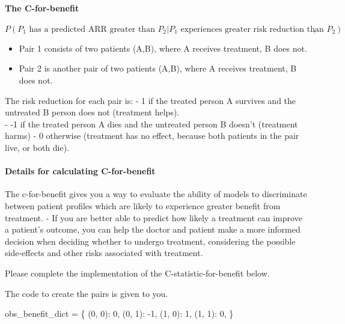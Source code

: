 \documentclass[11pt]{article}
\providecommand{\tightlist}{%
      \setlength{\itemsep}{0pt}\setlength{\parskip}{0pt}}
\newenvironment{Shaded}{}{}
\newcommand{\DecValTok}[1]{\textcolor[rgb]{0.25,0.63,0.44}{{#1}}}
\newcommand{\NormalTok}[1]{{#1}}
\begin{document}
    \hypertarget{the-c-for-benefit}{%
\paragraph{The C-for-benefit}\label{the-c-for-benefit}}

\[P(\text{$P_1$ has a predicted ARR greater than $P_2$} | \text{$P_1$ experiences greater risk reduction than $P_2$}),\]

\begin{itemize}
\tightlist
\item
  Pair 1 consists of two patients (A,B), where A receives treatment, B
  does not.
\item
  Pair 2 is another pair of two patients (A,B), where A receives
  treatment, B does not.
\end{itemize}

The risk reduction for each pair is: - 1 if the treated person A
survives and the untreated B person does not (treatment helps).\\
- -1 if the treated person A dies and the untreated person B doesn't
(treatment harms) - 0 otherwise (treatment has no effect, because both
patients in the pair live, or both die).

    \hypertarget{details-for-calculating-c-for-benefit}{%
\paragraph{Details for calculating
C-for-benefit}\label{details-for-calculating-c-for-benefit}}

The c-for-benefit gives you a way to evaluate the ability of models to
discriminate between patient profiles which are likely to experience
greater benefit from treatment. - If you are better able to predict how
likely a treatment can improve a patient's outcome, you can help the
doctor and patient make a more informed decision when deciding whether
to undergo treatment, considering the possible side-effects and other
risks associated with treatment.

Please complete the implementation of the C-statistic-for-benefit below.

The code to create the pairs is given to you.

\begin{Shaded}
\begin{Highlighting}[]
\NormalTok{obs_benefit_dict = \{}
\NormalTok{        (}\DecValTok{0}\NormalTok{, }\DecValTok{0}\NormalTok{): }\DecValTok{0}\NormalTok{,}
\NormalTok{        (}\DecValTok{0}\NormalTok{, }\DecValTok{1}\NormalTok{): }\DecValTok{-1}\NormalTok{,}
\NormalTok{        (}\DecValTok{1}\NormalTok{, }\DecValTok{0}\NormalTok{): }\DecValTok{1}\NormalTok{,}
\NormalTok{        (}\DecValTok{1}\NormalTok{, }\DecValTok{1}\NormalTok{): }\DecValTok{0}\NormalTok{,}
\NormalTok{    \}}
\end{Highlighting}
\end{Shaded}
\end{document}

